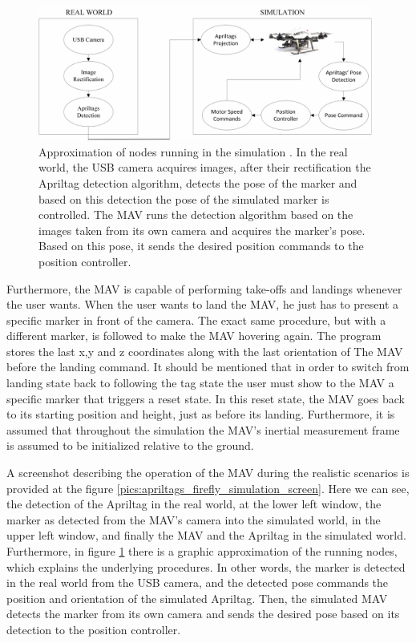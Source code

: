 \begin{figure}
   \centering
   \includegraphics[width=0.98\textwidth]{images/cam_firefly_sim.pdf}
   \caption{Approximation of nodes running in the simulation \protect\footnotemark. In the real world, the USB camera acquires images, after their rectification the Apriltag detection algorithm, detects the pose of the marker and based on this detection the pose of the simulated marker is controlled. The MAV runs the detection algorithm based on the images taken from its own camera and acquires the marker's pose. Based on this pose, it sends the desired position commands to the position controller.}
   \label{pics:mav_demo_camera_rosgraph}
\end{figure}



Furthermore, the MAV is capable of performing take-offs and landings whenever the user wants. When the user wants to land the MAV, he just has to present a specific marker in front of the camera. The exact same procedure, but with a different marker, is followed to make the MAV hovering again. The program stores the last x,y and z coordinates along with the last orientation of The MAV before the landing command. It should be mentioned that in order to switch from landing state back to following the tag state the user must show to the MAV a specific marker that triggers a reset state. In this reset state, the MAV goes back to its starting position and height, just as before its landing. Furthermore, it is assumed that throughout the simulation the MAV's inertial measurement frame is assumed to be initialized relative to the ground.

A screenshot describing the operation of the MAV during the realistic scenarios is provided at the figure \ref{pics:apriltags_firefly_simulation_screen}. Here we can see, the detection of the Apriltag in the real world, at the lower left window, the marker as detected from the MAV's camera into the simulated world, in the upper left window, and finally the MAV and the Apriltag in the simulated world. Furthermore, in figure \ref{pics:mav_demo_camera_rosgraph} there is a graphic approximation of the running nodes, which explains the underlying procedures. In other words, the marker is detected in the real world from the USB camera, and the detected pose commands the position and orientation of the simulated Apriltag. Then, the simulated MAV detects the marker from its own camera and sends the desired pose based on its detection to the position controller. 

